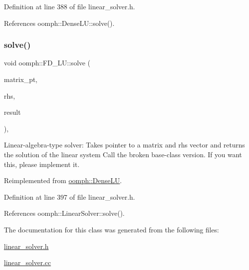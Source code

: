 Definition at line 388 of file linear\+\_\+solver.\+h.



References oomph\+::\+Dense\+L\+U\+::solve().

\mbox{\label{classoomph_1_1FD__LU_a2a44542b29faa39f1b816dc80da9eba1}} 
\subsubsection{\texorpdfstring{solve()}{solve()}\hspace{0.1cm}{\footnotesize\ttfamily [3/3]}}
{\footnotesize\ttfamily void oomph\+::\+F\+D\+\_\+\+L\+U\+::solve (\begin{DoxyParamCaption}\item[{\hyperlink{classoomph_1_1DoubleMatrixBase}{Double\+Matrix\+Base} $\ast$const \&}]{matrix\+\_\+pt,  }\item[{const \hyperlink{classoomph_1_1Vector}{Vector}$<$ double $>$ \&}]{rhs,  }\item[{\hyperlink{classoomph_1_1Vector}{Vector}$<$ double $>$ \&}]{result }\end{DoxyParamCaption})\hspace{0.3cm}{\ttfamily [inline]}, {\ttfamily [virtual]}}



Linear-\/algebra-\/type solver\+: Takes pointer to a matrix and rhs vector and returns the solution of the linear system Call the broken base-\/class version. If you want this, please implement it. 



Reimplemented from \hyperlink{classoomph_1_1DenseLU_a1d79cf13a269733d655e3e90c447f84d}{oomph\+::\+Dense\+LU}.



Definition at line 397 of file linear\+\_\+solver.\+h.



References oomph\+::\+Linear\+Solver\+::solve().



The documentation for this class was generated from the following files\+:\begin{DoxyCompactItemize}
\item 
\hyperlink{linear__solver_8h}{linear\+\_\+solver.\+h}\item 
\hyperlink{linear__solver_8cc}{linear\+\_\+solver.\+cc}\end{DoxyCompactItemize}
